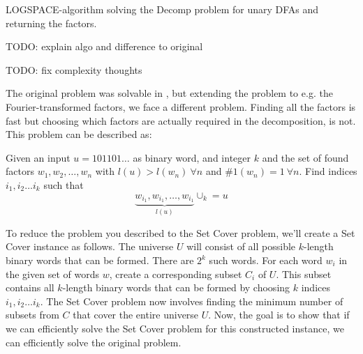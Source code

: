 \begin{algorithm}[H]
	\label{algo:composite}
	\DontPrintSemicolon
	
	
	
	\caption{LOGSPACE-algorithm solving the Decomp problem for unary DFAs and returning the factors.}
\end{algorithm}

TODO: explain algo and difference to original

TODO: fix complexity thoughts

The original problem was solvable in \LogSpace, but extending the problem to e.g. the Fourier-transformed factors, we face a different problem. Finding all the factors is fast but choosing which factors are actually required in the decomposition, is not. This problem can be described as:

Given an input $u = 101101\dots$ as binary word, and integer $k$ and the set of found factors $w_1, w_2, \dots, w_n$ with $l(u) > l(w_n) ~\forall n$ and $\#1(w_n) = 1 ~\forall n$. Find indices $i_1, i_2 \dots i_k$ such that
\[
\underbrace{w_{i_1}, w_{i_1}, \dots, w_{i_1}}_{l(u)} \cup_k = u
\]

To reduce the problem you described to the Set Cover problem, we'll create a Set Cover instance as follows. The universe $U$ will consist of all possible $k$-length binary words that can be formed. There are $2^k$ such words.
For each word $w_i$ in the given set of words $w$, create a corresponding subset $C_i$ of $U$. This subset contains all $k$-length binary words that can be formed by choosing $k$ indices $i_1, i_2 \dots i_k$. The Set Cover problem now involves finding the minimum number of subsets from $C$ that cover the entire universe $U$. Now, the goal is to show that if we can efficiently solve the Set Cover problem for this constructed instance, we can efficiently solve the original problem.

